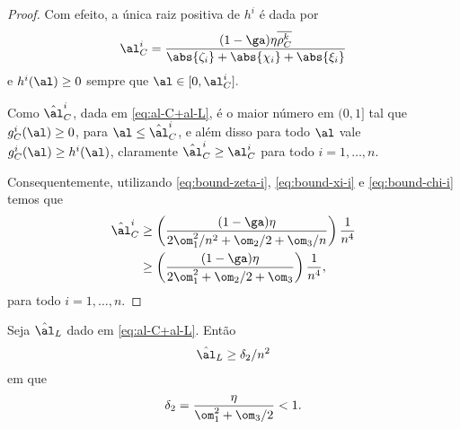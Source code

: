 \begin{proof}
Com efeito, a única raiz positiva de $h^i$ é dada por
\[
\al_{C}^i = \dfrac{(1-\ga)\eta\dbvec{\rho_C^k }}{\abs{\zeta_i} + \abs{\chi_i} + \abs{\xi_i}}
\]
e $h^i(\al)\geq 0$ sempre que $\al\in[0,\al_{C}^i].$ 

Como $\nextal^{i}_{C}$, dada em \eqref{eq:al-C+al-L}, é o maior número em $(0,1]$ tal que $g_{C}^{i}(\al)\geq 0$, para $\al\leq\nextal^{i}_{C}$, e além disso para todo $\al$ vale $g_{C}^{i}(\al) \geq h^{i}(\al)$, claramente $\nextal^{i}_{C} \geq  \al_{C}^i$ para todo $i=1,\ldots,n$.

Consequentemente, utilizando \eqref{eq:bound-zeta-i}, \eqref{eq:bound-xi-i} e \eqref{eq:bound-chi-i} temos que 
\[
\begin{aligned}
\nextal_{C}^i & \geq \left(\dfrac{(1-\ga)\eta}{2\om_{1}^{2}/n^{2} + \om_{2}/2 + \om_{3}/n  }\right)\dfrac{1}{n^{4}} \\			  & \geq \left(\dfrac{(1-\ga)\eta}{2\om_{1}^{2} + \om_{2}/2 + \om_{3}  }\right)\dfrac{1}{n^{4}},
\end{aligned}
\]
 para todo $i=1,\ldots,n$. 
 \end{proof}






\begin{lema}\label{lemma:alL_delta-2}
Seja $\nextal_{L}$ dado em \eqref{eq:al-C+al-L}. Então 
\[
\nextal_{L} \geq \delta_{2}/n^{2}
\]
em que 
\[
\delta_{2} = \frac{\eta }{\om_{1}^{2} + \om_{3}/2} < 1.
\]
\end{lema}


